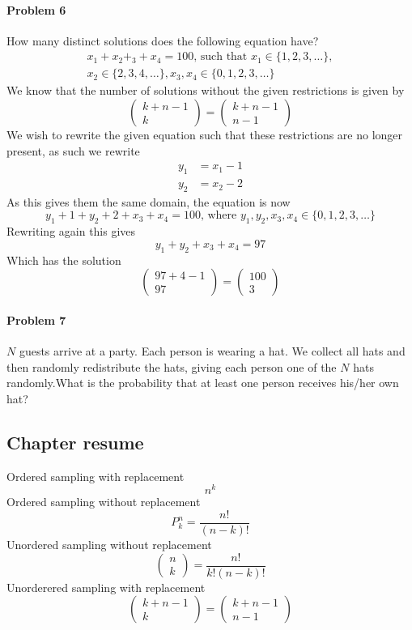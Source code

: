 \paragraph{Problem 6}
How many distinct solutions does the following equation have?
\begin{equation*}
    \begin{gathered}
        x_{1}+x_{2}+_{3}+x_{4}=100\text{, such that } x_{1}\in\{1,2,3,\ldots\}, \\
        x_{2}\in\{2,3,4,\ldots\},x_{3},x_{4}\in\{0,1,2,3,\ldots\}
    \end{gathered}
\end{equation*}
We know that the number of solutions without the given restrictions is given by
\[
    \begin{pmatrix}k+n-1\\k\end{pmatrix}=\begin{pmatrix}k+n-1\\n-1\end{pmatrix}
\]
We wish to rewrite the given equation such that these restrictions are no longer present, as such we rewrite
\begin{align*}
    y_{1}&=x_{1}-1 \\
    y_{2}&=x_{2}-2
\end{align*}
As this gives them the same domain, the equation is now
\[
    y_{1}+1+y_{2}+2+x_{3}+x_{4}=100\text{, where }y_{1},y_{2},x_{3},x_{4}\in\{0,1,2,3,\ldots\}
\]
Rewriting again this gives
\[
    y_{1}+y_{2}+x_{3}+x_{4}=97
\]
Which has the solution
\[
    \begin{pmatrix}97+4-1\\97\end{pmatrix}=\begin{pmatrix}100\\3\end{pmatrix}
\]
\paragraph{Problem 7}
$N$ guests arrive at a party. Each person is wearing a hat. We collect all hats and then randomly redistribute the hats, giving each person one of the $N$ hats randomly.What is the probability that at least one person receives his/her own hat?
\subsection{Chapter resume}
  Ordered sampling with replacement
  \[
      n^{k}
  \]
  Ordered sampling without replacement
  \[
      P_{k}^{n}=\frac{n!}{(n-k)!}
  \]
  Unordered sampling without replacement
  \[
      \begin{pmatrix}n\\k\end{pmatrix}=\frac{n!}{k!(n-k)!}
  \]
  Unorderered sampling with replacement
  \[
      \begin{pmatrix}k+n-1\\k\end{pmatrix}=\begin{pmatrix}k+n-1\\n-1\end{pmatrix}
  \]
